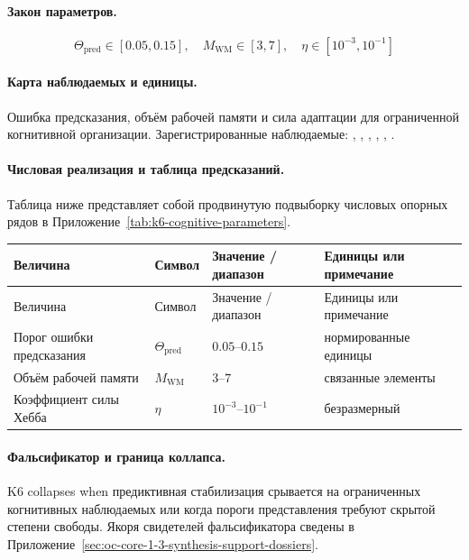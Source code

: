 \paragraph{Закон параметров.}
\[
\Theta_{\mathrm{pred}} \in [0.05,0.15],\quad M_{\mathrm{WM}} \in [3,7],\quad \eta \in [10^{-3},10^{-1}]
\]

\paragraph{Карта наблюдаемых и единицы.}
Ошибка предсказания, объём рабочей памяти и сила адаптации для ограниченной когнитивной организации.
Зарегистрированные наблюдаемые: , \allowbreak {}, \allowbreak {}, \allowbreak {}, \allowbreak {}, \allowbreak {}.

\paragraph{Числовая реализация и таблица предсказаний.}
Таблица ниже представляет собой продвинутую подвыборку числовых опорных рядов в Приложение~\ref{tab:k6-cognitive-parameters}.
\begin{longtable}{@{}L{0.27\textwidth}L{0.15\textwidth}L{0.24\textwidth}L{0.16\textwidth}@{}}
\toprule
Величина & Символ & Значение / диапазон & Единицы или примечание \\
\midrule
\endfirsthead
\toprule
Величина & Символ & Значение / диапазон & Единицы или примечание \\
\midrule
\endhead
Порог ошибки предсказания & $\scriptstyle \Theta_{\mathrm{pred}}$ & $0.05\text{--}0.15$ & нормированные единицы \\
Объём рабочей памяти & $\scriptstyle M_{\mathrm{WM}}$ & $3\text{--}7$ & связанные элементы \\
Коэффициент силы Хебба & $\scriptstyle \eta$ & $10^{-3}\text{--}10^{-1}$ & безразмерный \\
\bottomrule
\end{longtable}

\paragraph{Фальсификатор и граница коллапса.}
K6 collapses when предиктивная стабилизация срывается на ограниченных когнитивных наблюдаемых или когда пороги представления требуют скрытой степени свободы.
Якоря свидетелей фальсификатора сведены в Приложение~\ref{sec:oc-core-1-3-synthesis-support-dossiers}.

